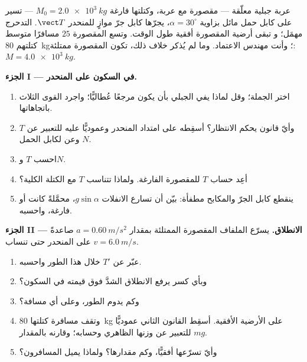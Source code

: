 \begin{problem}
\label{pb:g12:newtons-laws:1}
عربة جبلية معلّقة --- مقصورة مع عربة، وكتلتها فارغة $M_0 = \qty{2.0e3}{kg}$ ---
تسير على كابل حمل مائل بزاوية $\alpha = 30^\circ$، يجرّها كابل جرّ
موازٍ للمنحدر  $\vect T$.  التدحرج مهمَل؛ و
تبقى أرضية المقصورة أفقية طول الوقت. وتسع المقصورة $25$ مسافرًا متوسط
كتلتهم \qty{80}{kg}؛ وأنت مهندس الاعتماد. وما لم يُذكر خلاف ذلك، تكون
المقصورة ممتلئة: $M = \qty{4.0e3}{kg}$.

\medskip
\noindent\textbf{الجزء I --- في السكون على المنحدر.}
\begin{enumerate}
  \item اختر الجملة؛ وقل لماذا يفي  الجبلي بأن يكون مرجعًا عُطاليًّا؛
        واجرد القوى الثلاث باتجاهاتها.
  \item وأيّ قانون يحكم الانتظار؟ أسقِطه على امتداد المنحدر وعموديًّا عليه
        للتعبير عن $T$ وعن  لكابل الحمل $N$.
  \item احسب $T$ و$N$.
  \item أعِد حساب $T$ للمقصورة الفارغة. ولماذا تتناسب $T$ مع الكتلة الكلية؟
  \item ينقطع كابل الجرّ والمكابح مطفأة: بيّن أن تسارع الانفلات
        $g \sin\alpha$، محمَّلةً كانت أو فارغة، واحسبه.
\end{enumerate}

\medskip
\noindent\textbf{الجزء II --- الانطلاق.} يسرّع الملفاف المقصورة الممتلئة بمقدار
$a = \qty{0.60}{m/s^2}$ صاعدةً على المنحدر حتى تنساب  $v = \qty{6.0}{m/s}$.
\begin{enumerate}[resume]
  \item عبّر عن  $T'$ خلال هذا الطور واحسبه.
  \item وبأي كسر يرفع الانطلاق الشدَّ فوق قيمته في السكون؟
  \item وكم يدوم الطور، وعلى أي مسافة؟
  \item وتقف مسافرة كتلتها \qty{80}{kg} على الأرضية الأفقية. أسقِط القانون
        الثاني عموديًّا للتعبير عن وزنها الظاهري وحسابه؛ وقارنه بالمقدار $mg$.
  \item وأيّ  تسرّعها أفقيًّا، وكم مقدارها؟ ولماذا يميل المسافرون؟
\end{enumerate}


\end{problem}
